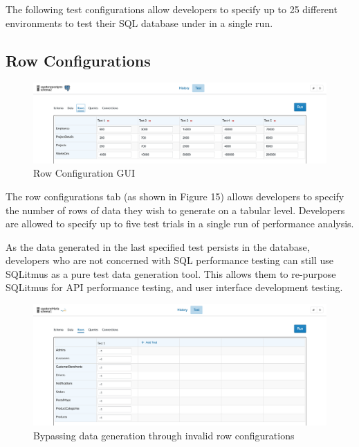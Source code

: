 \documentclass[12pt]{report}
\begin{document}
\begin{spacing}{1.9}
	
	The following test configurations allow developers to specify up to 25 different environments to test their SQL database under in a single run.
	
	\subsection{Row Configurations}
	
	\begin{figure}[H]
		\centering
		\includegraphics[width=\textwidth]{3-4-1.png}
		\caption{Row Configuration GUI}
		
	\end{figure}
	
	The row configurations tab (as shown in Figure 15) allows developers to specify the number of rows of data they wish to generate on a tabular level. Developers are allowed to specify up to five test trials in a single run of performance analysis.
	
	As the data generated in the last specified test persists in the database, developers who are not concerned with SQL performance testing can still use SQLitmus as a pure test data generation tool. This allows them to re-purpose SQLitmus for API performance testing, and user interface development testing.
	
	\begin{figure}[H]
		\centering
		\includegraphics[width=\textwidth]{3-4-1b.png}
		\caption{Bypassing data generation through invalid row configurations}
		
	\end{figure}
	

\end{spacing}
\end{document}
